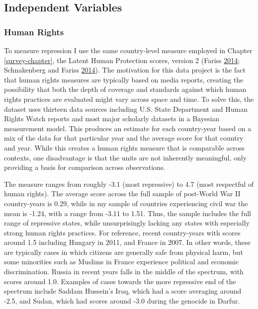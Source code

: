 \documentclass[12pt,]{book}
\theoremstyle{definition}
\theoremstyle{definition}
\theoremstyle{definition}
\theoremstyle{remark}
\begin{document}
\hypertarget{independent-variables-1}{%
\subsection{Independent Variables}\label{independent-variables-1}}

\hypertarget{human-rights}{%
\subsubsection*{Human Rights}\label{human-rights}}

To measure repression I use the same country-level measure employed in
Chapter \ref{survey-chapter}, the Latent Human Protection scores,
version 2 (Fariss \protect\hyperlink{ref-Fariss2014}{2014}; Schnakenberg
and Fariss \protect\hyperlink{ref-Schnakenberg2014}{2014}). The
motivation for this data project is the fact that human rights measures
are typically based on media reports, creating the possibility that both
the depth of coverage and standards against which human rights practices
are evaluated might vary across space and time. To solve this, the
dataset uses thirteen data sources including U.S. State Department and
Human Rights Watch reports and most major scholarly datasets in a
Bayesian measurement model. This produces an estimate for each
country-year based on a mix of the data for that particular year and the
average score for that country and year. While this creates a human
rights measure that is comparable across contexts, one disadvantage is
that the units are not inherently meaningful, only providing a basis for
comparison across observations.

The measure ranges from roughly -3.1 (most repressive) to 4.7 (most
respectful of human rights). The average score across the full sample of
post-World War II country-years is 0.29, while in my sample of countries
experiencing civil war the mean is -1.24, with a range from -3.11 to
1.51. Thus, the sample includes the full range of repressive states,
while unsurprisingly lacking any states with especially strong human
rights practices. For reference, recent country-years with scores around
1.5 including Hungary in 2011, and France in 2007. In other words, these
are typically cases in which citizens are generally safe from physical
harm, but some minorities such as Muslims in France experience political
and economic discrimination. Russia in recent years falls in the middle
of the spectrum, with scores around 1.0. Examples of cases towards the
more repressive end of the spectrum include Saddam Hussein's Iraq, which
had a score averaging around -2.5, and Sudan, which had scores around
-3.0 during the genocide in Darfur.
\end{document}
